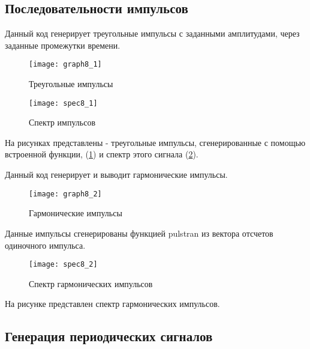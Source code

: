 \subsection{Последовательности импульсов}


\parindent=1cm
Данный код генерирует треугольные импульсы с заданными амплитудами, через заданные промежутки времени.

\begin{figure}[H]
	\begin{center}
		\texttt{[image: graph8\_1]}
		\caption{Треугольные импульсы} 
		\label{pic:graph8_1} %
	\end{center}
\end{figure}
\begin{figure}[H]
	\begin{center}
		\texttt{[image: spec8\_1]}
		\caption{Спектр импульсов} 
		\label{pic:spec8_1} %
	\end{center}
\end{figure}
На рисунках представлены - треугольные импульсы, сгенерированные с помощью встроенной функции, (\ref{pic:graph8_1}) и спектр этого сигнала (\ref{pic:spec8_1}).


\parindent=1cm
Данный код генерирует и выводит гармонические импульсы.

\begin{figure}[H]
	\begin{center}
		\texttt{[image: graph8\_2]}
		\caption{Гармонические импульсы} 
		\label{pic:graph8_2} %
	\end{center}
\end{figure}
Данные импульсы сгенерированы функцией pulstran из вектора отсчетов одиночного импульса.
\begin{figure}[H]
	\begin{center}
		\texttt{[image: spec8\_2]}
		\caption{Спектр гармонических импульсов} 
		\label{pic:spec8_2} %
	\end{center}
\end{figure}
На рисунке представлен спектр гармонических импульсов.


\subsection{Генерация периодических сигналов}

